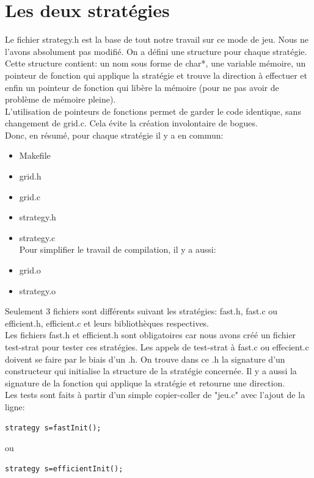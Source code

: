 \documentclass{report}
\begin{document}
\section{Les deux stratégies}
Le fichier strategy.h est la base de tout notre travail sur ce mode de jeu. Nous ne l'avons absolument pas modifié. On a défini une structure pour chaque stratégie. Cette structure contient: un nom sous forme de char*, une variable mémoire, un pointeur de fonction qui applique la stratégie et trouve la direction à effectuer et enfin un pointeur de fonction qui libère la mémoire (pour ne pas avoir de problème de mémoire pleine).\\
L'utilisation de pointeurs de fonctions permet de garder le code identique, sans changement de grid.c. Cela évite la création involontaire de bogues.\\
Donc, en résumé, pour chaque stratégie il y a en commun:
\begin{itemize}
\item Makefile
\item grid.h
\item grid.c
\item strategy.h
\item strategy.c\\
Pour simplifier le travail de compilation, il y a aussi:
\item grid.o
\item strategy.o\\
\end{itemize}
Seulement 3 fichiers sont différents suivant les stratégies: fast.h, fast.c ou efficient.h, efficient.c et leurs bibliothèques respectives.\\
Les fichiers fast.h et efficient.h sont obligatoires car nous avons créé un fichier test-strat pour tester ces stratégies. Les appels de test-strat à fast.c ou effecient.c doivent se faire par le biais d'un .h. On trouve dans ce .h la signature d'un constructeur qui initialise la structure de la stratégie concernée. Il y a aussi la signature de la fonction qui applique la stratégie et retourne une direction.\\
Les tests sont faits à partir d'un simple copier-coller de "jeu.c" avec l'ajout de la ligne:
\begin{lstlisting}[frame=single]
strategy s=fastInit();
\end{lstlisting}
ou
\begin{lstlisting}[frame=single]
strategy s=efficientInit();
\end{lstlisting}
\end{document}
